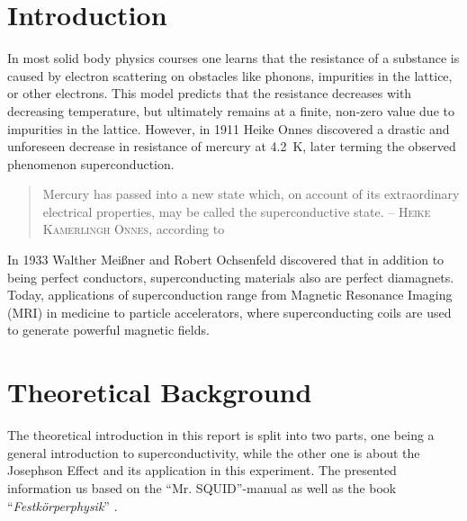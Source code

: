 \documentclass[a4paper,10pt]{article}
\begin{document}
\section{Introduction}
In most solid body physics courses one learns that the resistance of a substance is caused by electron scattering on obstacles like phonons, impurities in the lattice, or other electrons.\cite{grossmarx} This model predicts that the resistance decreases with decreasing temperature, but ultimately remains at a finite, non-zero value due to impurities in the lattice. 
However, in 1911 Heike Onnes discovered a drastic and unforeseen decrease in resistance of mercury at \SI{4.2}{\kelvin}, later terming the observed phenomenon superconduction. 
\begin{quote}
    Mercury has passed into a new state which, on account of its extraordinary electrical properties, may be called the superconductive state. \newline
    -- \textsc{Heike Kamerlingh Onnes}, according to \cite{grossmarx}
\end{quote} 
In 1933 Walther Meißner and Robert Ochsenfeld discovered that in addition to being perfect conductors, superconducting materials also are perfect diamagnets. Today, applications of superconduction range from Magnetic Resonance Imaging (MRI) in medicine to particle accelerators, where superconducting coils are used to generate powerful magnetic fields.\cite{grossmarx}

\section{Theoretical Background}

The theoretical introduction in this report is split into two parts, one being a general introduction to superconductivity, while the other one is about the Josephson Effect and its application in this experiment. The presented information us based on the ``Mr. SQUID''-manual \cite{skriptum} as well as the book ``\textit{Festkörperphysik}'' \cite{grossmarx}.
\end{document}
